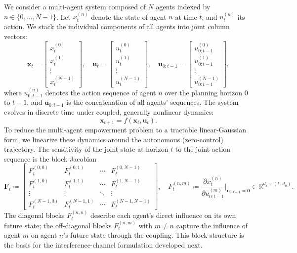 \documentclass{article} %
\begin{document}
We consider a multi-agent system composed of $N$ agents indexed by $n \in \{0, \ldots, N-1\}$. Let $x_t^{(n)}$ denote the state of agent $n$ at time $t$, and $u_t^{(n)}$ its action. We stack the individual components of all agents into joint column vectors:
\begin{equation*}
    \mathbf{x}_t =
    \begin{bmatrix}
        x_t^{(0)} \\ x_t^{(1)} \\ \vdots \\ x_t^{(N-1)}
    \end{bmatrix}, \quad
    \mathbf{u}_t =
    \begin{bmatrix}
        u_t^{(0)} \\ u_t^{(1)} \\ \vdots \\ u_t^{(N-1)}
    \end{bmatrix}, \quad
    \mathbf{u}_{0:t-1} =
    \begin{bmatrix}
        u_{0:t-1}^{(0)} \\ u_{0:t-1}^{(1)} \\ \vdots \\ u_{0:t-1}^{(N-1)}
    \end{bmatrix},
\end{equation*}
where $u_{0:t-1}^{(n)}$ denotes the action sequence of agent $n$ over the planning horizon $0$ to $t-1$, and $\mathbf{u}_{0:t-1}$ is the concatenation of all agents' sequences. The system evolves in discrete time under coupled, generally nonlinear dynamics:
\begin{equation*}
    \mathbf{x}_{t+1} = f(\mathbf{x}_t, \mathbf{u}_t).
\end{equation*}
To reduce the multi-agent empowerment problem to a tractable linear-Gaussian form, we linearize these dynamics around the autonomous (zero-control) trajectory. The sensitivity of the joint state at horizon $t$ to the joint action sequence is the block Jacobian
\begin{equation}\label{eq:block_sensitivity}
    \mathbf{F}_t \coloneq
    \begin{bmatrix}
        F_t^{(0, 0)} & F_t^{(0, 1)} & \cdots & F_t^{(0, N-1)} \\
        F_t^{(1, 0)} & F_t^{(1, 1)} & \cdots & F_t^{(1, N-1)} \\
        \vdots & \vdots & \ddots & \vdots \\
        F_t^{(N-1, 0)} & F_t^{(N-1, 1)} & \cdots & F_t^{(N-1, N-1)}
    \end{bmatrix}, \quad F_t^{(n, m)} \coloneq \frac{\partial x_t^{(n)}}{\partial u_{0:t-1}^{(m)}}\bigg|_{\mathbf{u}_{0:t-1}=\mathbf{0}} \in \mathbb{R}^{d_x \times (t \cdot d_u)}.
\end{equation}
The diagonal blocks $F_t^{(n,n)}$ describe each agent's direct influence on its own future state; the off-diagonal blocks $F_t^{(n,m)}$ with $m \neq n$ capture the influence of agent $m$ on agent $n$'s future state through the coupling. This block structure is the basis for the interference-channel formulation developed next.
\end{document}
